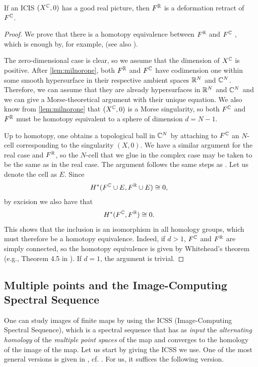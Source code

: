 \documentclass[a4paper,12pt]{amsart}
\begin{document}
\begin{theorem}\label{thm:iciscase}
If an ICIS $(X^{\mathbb{C}},0)$ has a good real picture, then $F^{\mathbb{R}}$ is a deformation retract of $F^{\mathbb{C}}$.
\end{theorem}
\begin{proof}
We prove that there is a homotopy equivalence between $F^{\mathbb{R}}$ and $F^{\mathbb{C}}$ , which is enough by, for example, \cite[Corollary 0.20]{Hatcher2002} (see also \cite[Proposition 0.16]{Hatcher2002}).
\newline

The zero-dimensional case is clear, so we assume that the dimension of $X^{\mathbb{C}}$ is positive. After \cref{lem:milnorone}, both $F^{\mathbb{R}}$ and $F^{\mathbb{C}}$ have codimension one within some smooth hypersurface in their respective ambient spaces $\mathbb{R}^N$ and $\mathbb{C}^N$. Therefore, we can assume that they are already hypersurfaces in $\mathbb{R}^N$ and $\mathbb{C}^N$ and we can give a Morse-theoretical argument with their unique equation. We also know from \cref{lem:milnorone} that $(X^{\mathbb{C}},0)$ is a Morse singularity, so both $F^{\mathbb{C}}$ and $F^{\mathbb{R}}$ must be homotopy equivalent to a sphere of dimension $d=N-1$. 

Up to homotopy, one obtains a topological ball in $\mathbb{C}^N$ by attaching to $F^{\mathbb{C}}$ an $N$-cell corresponding to the singularity $(X,0)$. We have a similar argument for the real case and $F^{\mathbb{R}}$, so the $N$-cell that we glue in the complex case may be taken to be the same as in the real case. The argument follows the same steps as \cite[Lemma 2-2]{Mond1996}. Let us denote the cell as $E$. Since
\[H^*(F^{\mathbb{C}}\cup E, F^{\mathbb{R}}\cup E)\cong 0,\]
by excision we also have that
\[H^*(F^{\mathbb{C}}, F^{\mathbb{R}})\cong 0.\]
This shows that the inclusion is an isomorphism in all homology groups, which must therefore be a homotopy equivalence. Indeed, if $d>1$, $F^{\mathbb{C}}$ and $F^{\mathbb{R}}$ are simply connected, so the homotopy equivalence is given by Whitehead's theorem (e.g., Theorem 4.5 in \cite{Hatcher2002}).
 If $d=1$, the argument is trivial.
\end{proof}

\subsection{Multiple points and the Image-Computing Spectral Sequence}\label{sec: ICSS}

One can study images of finite maps by using the ICSS (Image-Computing Spectral Sequence), which is a spectral sequence that has as \textsl{input} the \textsl{alternating homology} of the \textsl{multiple point spaces} of the map and converges to the homology of the image of the map. Let us start by giving the ICSS we use. One of the most general versions is given in \cite[Theorem 5.4]{Houston2007}, cf. \cite{Goryunov1993,Goryunov1995,CisnerosMolina2022,Mond2020}. For us, it suffices the following version.
\end{document}

